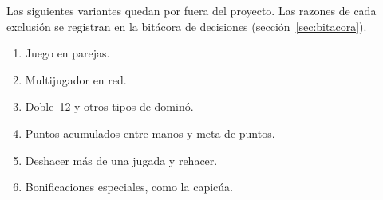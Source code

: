 Las siguientes variantes quedan por fuera del proyecto. Las razones de cada exclusión se registran en la bitácora de decisiones (sección~\ref{sec:bitacora}).

\begin{enumerate}
  \item Juego en parejas.
  \item Multijugador en red.
  \item Doble~12 y otros tipos de dominó.
  \item Puntos acumulados entre manos y meta de puntos.
  \item Deshacer más de una jugada y rehacer.
  \item Bonificaciones especiales, como la capicúa.
\end{enumerate}
